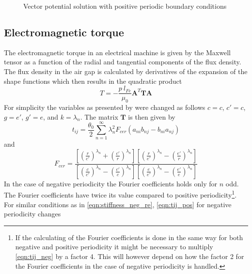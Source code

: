 \begin{figure}
    \centering
    
    \caption{Vector potential solution with positive periodic boundary conditions}
    \label{fig:f_vec_2}
\end{figure}


\subsection{Electromagnetic torque}\label{torque}
The electromagnetic torque in an electrical machine is given by the Maxwell tensor as a function of 
the radial and tangential components of the flux density. The flux density in the air gap is calculated 
by derivatives of the expansion of the shape functions which then results in the quadratic product
\begin{equation}
\label{eqn:torque}
  T = -\frac{p\:l_{Fe}}{\mu_{0}}\mathbf{A}^{T}\mathbf{T}\mathbf{A}
\end{equation}
For simplicity the variables as presented by \cite{razek_1981} were changed as follows $c=c$, $c'=c$, 
$g=e'$, $g'=e$, and $k=\lambda_{n}$. The matrix \(\mathbf{T}\) is then given by 
\begin{equation}\label{eqn:tij_pos}
    t_{ij}=\frac{\theta_{0}}{2}\sum^{\infty}_{n=1}\lambda^{2}_{n}
    F_{cer}\left(a_{ni}b_{nj}-b_{ni}a_{nj}\right)
\end{equation}
and
\begin{equation}\label{eqn:fcer}
    F_{cer}=\frac
    {\left[
        \left(\frac{r}{c'}\right)^{\lambda_{n}}+
        \left(\frac{c'}{r}\right)^{\lambda_{n}}
    \right]
    \left[
        \left(\frac{r}{e'}\right)^{\lambda_{n}}-
        \left(\frac{e'}{r}\right)^{\lambda_{n}}
    \right]
  }
  { \left[
        \left(\frac{c}{c'}\right)^{\lambda_{n}}-
        \left(\frac{c'}{c}\right)^{\lambda_{n}}
    \right]
    \left[
        \left(\frac{e}{e'}\right)^{\lambda_{n}}-
        \left(\frac{e'}{e}\right)^{\lambda_{n}}
    \right]
  } 
\end{equation}  
In the case of negative periodicity the Fourier coefficients holds only for $n$ odd. The Fourier 
coefficients have twice its value compared to positive periodicity\footnote{If the calculating of 
the Fourier coefficients is done in the same way for both negative and positive periodicity it might 
be necessary to multiply \eqref{eqn:tij_neg} by a factor 4. This will however depend on how the factor 
2 for the Fourier coefficients in the case of negative periodicity is handled.}. For similar 
conditions as in \eqref{eqn:stiffness_neg_re}, \eqref{eqn:tij_pos} for negative periodicity changes 
